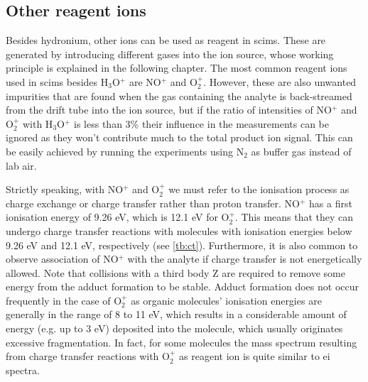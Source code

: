 \subsection{Other reagent ions} %
Besides hydronium, other ions can be used as reagent in \acrshort{scims}.
%
These are generated by introducing different gases into the ion source, whose working principle is explained in the following chapter.
%
The most common reagent ions used in \acrshort{scims} besides H$_3$O$^+$ are NO$^+$ and O$_2^+$.
%
However, these are also unwanted impurities that are found when the gas containing the analyte  is back-streamed from the drift tube into the ion source, but if the ratio of intensities of NO$^+$ and O$_2^+$ with H$_3$O$^+$ is less than 3\% their influence in the measurements can be ignored as they won't contribute much to the total product ion signal. This can be easily achieved by running the experiments using N$_2$ as buffer gas instead of lab air.






Strictly speaking, with NO$^+$ and O$_2^+$ we must refer to the ionisation process as charge exchange or charge transfer rather than proton transfer. NO$^+$ has a first ionisation energy of 9.26 eV, which is 12.1 eV for O$_2^+$. This means that they can undergo charge transfer reactions with molecules with ionisation energies below 9.26 eV and 12.1 eV, respectively  (see \autoref{tb:ct}).
%
Furthermore, it is also common to observe association of NO$^+$ with the analyte if charge transfer is not energetically allowed. Note that collisions with a third body  Z   are required to remove some energy from the adduct formation to be stable. Adduct formation does not occur frequently in the case of O$_2^+$ as organic molecules' ionisation energies are generally in the range of 8 to 11 eV, which results in a considerable amount of energy (e.g. up to 3 eV) deposited into the molecule, which usually originates excessive fragmentation. In fact, for some molecules the mass spectrum resulting from charge transfer reactions with O$_2^+$ as reagent ion is quite similar to  \acrshort{ei} spectra.%

